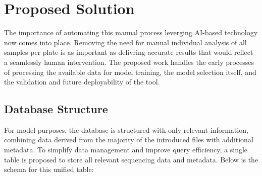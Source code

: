 \section{Proposed Solution}
\label{sec:model}

The importance of automating this manual process leverging AI-based technology now comes into place. Removing the need for manual individual analysis of all samples per plate is as important as delivring accurate results that would reflect a seamlessly human intervention.
The proposed work handles the early processes of processing the available data for model training, the model selection itself, and the validation and future deployability of the tool.

\subsection{Database Structure}
For model purposes, the database is structured with only relevant information, combining data derived from the majority of the introduced files with additional metadata. To simplify data management and improve query efficiency, a single table is proposed to store all relevant sequencing data and metadata. Below is the schema for this unified table:

